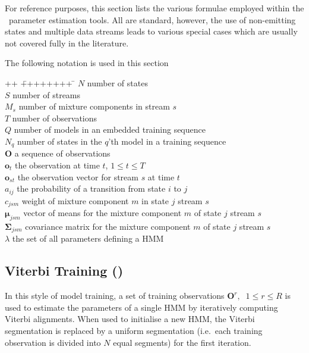 
For reference purposes, this section lists the various formulae 
employed within the \HTK\ parameter estimation tools. 
All are standard, however, the use of non-emitting
states and multiple data streams leads to various special cases which are
usually not covered fully in the literature.

The following notation is used in this section
\begin{tabbing}
++ \= ++++++++ \= \kill
\> $N$ \> number of states \\
\> $S$ \> number of streams \\
\> $M_s$ \> number of mixture components in stream $s$\\
\> $T$ \> number of observations \\
\> $Q$ \> number of models in an embedded training sequence \\
\> $N_q$ \> number of states in the $q$'th model in a training sequence \\
\> $\bm{O}$      \> a sequence of observations \\
\> $\bm{o}_t$    \> the observation at time $t$, $1 \leq t \leq T $ \\
\> $\bm{o}_{st}$ \> the observation vector for stream $s$ at time $t$ \\
\> $a_{ij}$       \> the probability of a transition from state $i$ to $j$ \\
\> $c_{jsm}$    \> weight of mixture component $m$ in state $j$ stream $s$\\
\> $\bm{\mu}_{jsm}$  \> vector of means for the mixture component $m$ of state $j$
                        stream $s$\\ 
\> $\bm{\Sigma}_{jsm}$  \> covariance matrix for the mixture component $m$ 
                         of state $j$  stream $s$ \\
\> $\lambda$ \> the set of all parameters defining a HMM
\end{tabbing}

\subsection{Viterbi Training ()}

In this style of model training, a set of training observations
$\bm{O}^r, \;\; 1 \leq r \leq R$ is used to estimate the 
parameters of a single HMM by iteratively computing Viterbi alignments.
When used to initialise a new HMM, the Viterbi segmentation is
replaced by a uniform segmentation (i.e.\ each training
observation is divided into $N$ equal segments) 
for the first iteration.

